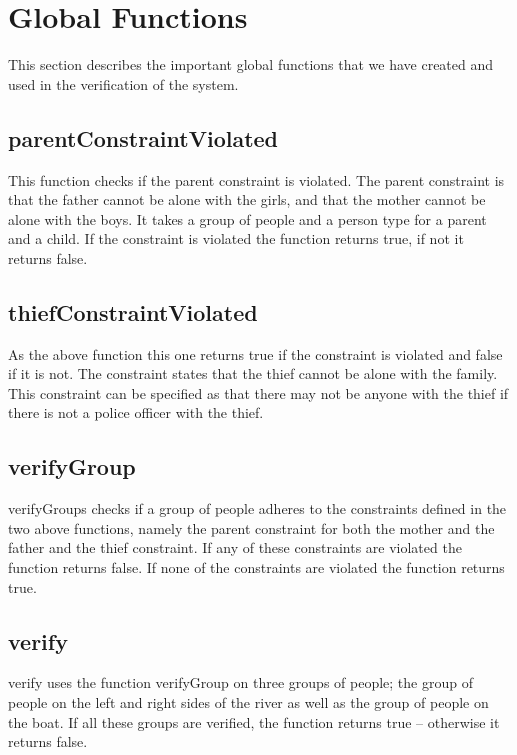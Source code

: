 \section{Global Functions}
This section describes the important global functions that we have created and used in the verification of the system.

\subsection{parentConstraintViolated}
This function checks if the parent constraint is violated. 
The parent constraint is that the father cannot be alone with the girls, and that the mother cannot be alone with the boys.
It takes a group of people and a person type for a parent and a child.
If the constraint is violated the function returns true, if not it returns false.

\subsection{thiefConstraintViolated}
As the above function this one returns true if the constraint is violated and false if it is not.
The constraint states that the thief cannot be alone with the family.
This constraint can be specified as that there may not be anyone with the thief if there is not a police officer with the thief.

\subsection{verifyGroup}
verifyGroups checks if a group of people adheres to the constraints defined in the two above functions, namely the parent constraint for both the mother and the father and the thief constraint.
If any of these constraints are violated the function returns false.
If none of the constraints are violated the function returns true.

\subsection{verify}
verify uses the function verifyGroup on three groups of people; the group of people on the left and right sides of the river as well as the group of people on the boat.
If all these groups are verified, the function returns true -- otherwise it returns false.